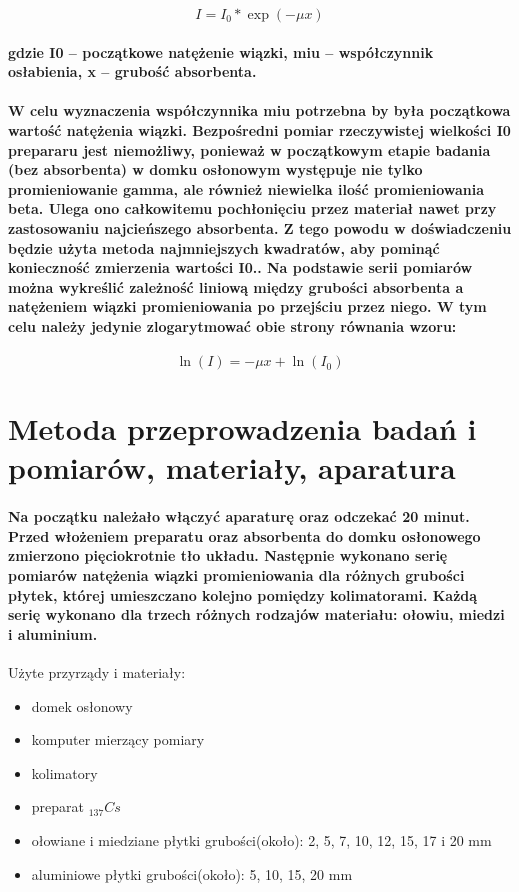 \documentclass[a4paper,10pt]{article}
\begin{document}
\begin{equation}
  I = I_0 * \exp(-\mu x)
\end{equation}
\paragraph{gdzie 	I0 – początkowe natężenie wiązki, miu – współczynnik osłabienia, x – grubość absorbenta.}
\paragraph{W celu wyznaczenia współczynnika miu potrzebna by była początkowa wartość natężenia wiązki.
 Bezpośredni pomiar rzeczywistej wielkości I0 prepararu jest niemożliwy, ponieważ w początkowym etapie badania
 (bez absorbenta) w domku osłonowym występuje nie tylko promieniowanie gamma, ale również niewielka ilość promieniowania beta.
 Ulega ono całkowitemu pochłonięciu przez materiał nawet przy zastosowaniu najcieńszego absorbenta.
 Z tego powodu w doświadczeniu będzie użyta metoda najmniejszych kwadratów, aby pominąć konieczność zmierzenia wartości
 I0.. Na podstawie serii pomiarów można wykreślić zależność liniową między grubości absorbenta a natężeniem wiązki
 promieniowania po przejściu przez niego. W tym celu należy jedynie zlogarytmować obie strony równania wzoru: }

\begin{equation}
  \ln(I) = -\mu x + \ln(I_0)
\end{equation}
\section{Metoda przeprowadzenia badań i pomiarów, materiały, aparatura}
\paragraph{Na początku należało włączyć aparaturę oraz odczekać 20 minut.
Przed włożeniem preparatu oraz absorbenta do domku osłonowego zmierzono pięciokrotnie
 tło układu. Następnie wykonano serię pomiarów natężenia wiązki promieniowania
 dla różnych grubości płytek, której umieszczano kolejno pomiędzy kolimatorami.
 Każdą serię wykonano dla trzech różnych rodzajów materiału: ołowiu, miedzi i aluminium.\\}

{Użyte przyrządy i materiały:}
\begin{itemize}
  \item domek osłonowy
  \item komputer mierzący pomiary
  \item kolimatory
  \item preparat $_{137}Cs$
  \item ołowiane i miedziane płytki grubości(około): 2, 5, 7, 10, 12, 15, 17 i 20 mm
  \item aluminiowe płytki grubości(około): 5, 10, 15, 20 mm
\end{itemize}
\end{document}
